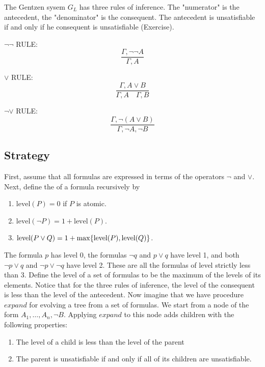 The Gentzen sysem $G_L$ has three rules of inference.    The "numerator" is the antecedent, the "denominator" is the consequent.  The antecedent is unsatisfiable if and only if he consequent is unsatisfiable (Exercise).

$\neg\neg$ RULE: $$\frac{\Gamma, \neg\neg A}{\Gamma, A} $$

$\lor$ RULE: $$\frac{\Gamma, A \lor B}{\Gamma, A \quad \Gamma, B} $$

$\neg\lor$ RULE: $$\frac{\Gamma, \neg(A \lor B)}{\Gamma, \neg A, \neg B} $$



\subsection{Strategy}


First, assume that all formulas are expressed in terms of the operators $\neg$ and $\lor$.  Next, define the  of a formula recursively by

\begin{enumerate}

\item $\text{level}(P) = 0$ if $P$ is atomic.

\item  $\text{level}(\neg P) = 1 + \text{level}(P)$.

\item  $\text{level}(P \lor Q) = 1 + \max \{ \text{level}(P), \text{level}(Q) \}$.

\end{enumerate}


The formula  $p$ has level 0, the formulas $\neg q$ and $p \lor q$ have  level 1, and both $\neg p \lor q$ and $\neg p \lor \neg q$ have level 2.  These are all the formulas of level strictly less than 3.  Define the level of a set of formulas to be the maximum of the levels of its elements.  Notice that for the three rules of inference, the level of the consequent is less than the level of the antecedent. Now imagine that we have procedure $expand$ for evolving a tree from a set of formulas. We start from a node of the form $A_1, \ldots, A_n, \neg B$.  Applying $expand$ to this node adds children with the following properties:

\begin{enumerate}
  \item The level of a child is less than the level of the parent
 \item  The parent is unsatisfiable if and only if all of its children are unsatisfiable.
\end{enumerate}

